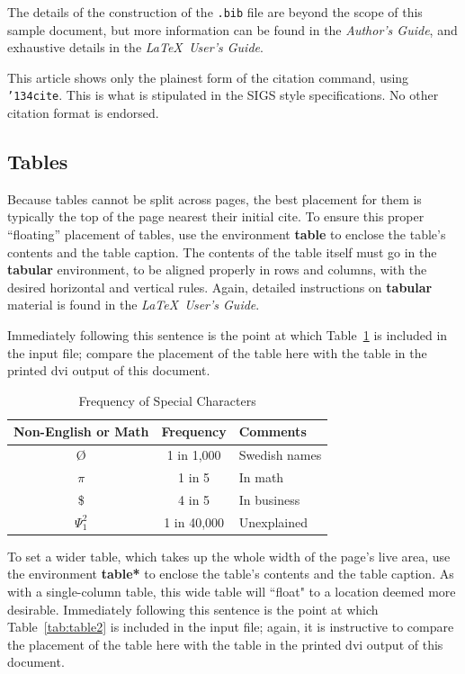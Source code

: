\documentclass[article]{stucosrec}
\begin{document}
	The details of the construction of the \texttt{.bib} file are beyond the scope of this sample document, but more
information can be found in the \textit{Author's Guide},
and exhaustive details in the \textit{\LaTeX\ User's
Guide}\cite{Lamport:LaTeX}.
	
	This article shows only the plainest form
of the citation command, using \texttt{{\char'134}cite}.
	This is what is stipulated in the SIGS style specifications.
	No other citation format is endorsed.
	
	\subsection{Tables}
	
	Because tables cannot be split across pages, the best
placement for them is typically the top of the page
nearest their initial cite.
	To
ensure this proper ``floating'' placement of tables, use the
environment \textbf{table} to enclose the table's contents and
the table caption.
	The contents of the table itself must go
in the \textbf{tabular} environment, to
be aligned properly in rows and columns, with the desired
horizontal and vertical rules.
	Again, detailed instructions
on \textbf{tabular} material
is found in the \textit{\LaTeX\ User's Guide}.
	
	Immediately following this sentence is the point at which
Table~\ref{tab:table1} is included in the input file; compare the
placement of the table here with the table in the printed
dvi output of this document.
	
	\begin{table}
		\centering
		\caption{Frequency of Special Characters}
		\label{tab:table1}
		\begin{tabular}{|c|c|l|} \hline
			Non-English or Math&Frequency&Comments\\ \hline
			\O & 1 in 1,000& Swedish names\\ \hline
			$\pi$ & 1 in 5& In math\\ \hline
			\$ & 4 in 5 & In business\\ \hline
			$\Psi^2_1$ & 1 in 40,000& Unexplained \\
\hline
		\end{tabular}
	\end{table}

	To set a wider table, which takes up the whole width of
the page's live area, use the environment
\textbf{table*} to enclose the table's contents and
the table caption.
	As with a single-column table, this wide
table will ``float" to a location deemed more desirable.
	Immediately following this sentence is the point at which
Table~\ref{tab:table2} is included in the input file; again, it is
instructive to compare the placement of the
table here with the table in the printed dvi
output of this document.
	
\end{document}
